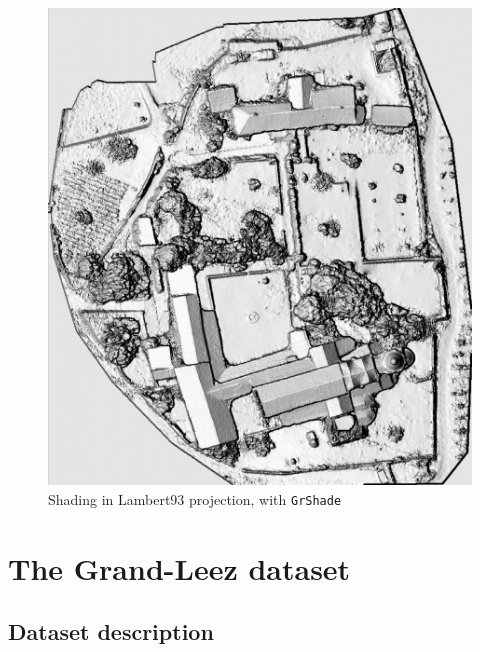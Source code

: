 \begin{figure}
\begin{center}
\includegraphics[width=160mm]{FIGS/Cuxa/L93-Shade.jpg}
\caption{Shading in Lambert93 projection, with {\tt GrShade}}
\end{center}
\end{figure}

\section{The Grand-Leez dataset}

\subsection{Dataset description}\label{Grand-Leez:DataSet}

